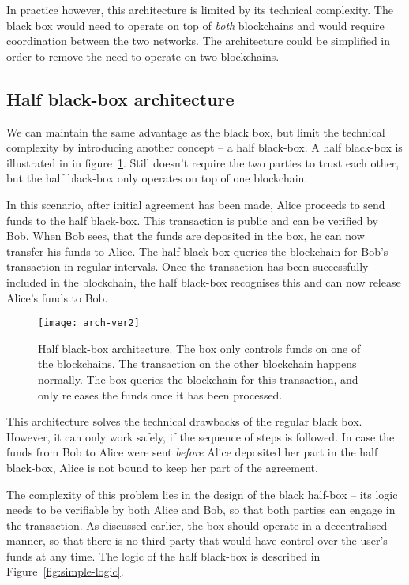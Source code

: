 In practice however, this architecture is limited by its technical complexity. The black box would need to operate on top of \textit{both} blockchains and would require coordination between the two networks. The architecture could be simplified in order to remove the need to operate on two blockchains.

\subsection{Half black-box architecture}
We can maintain the same advantage as the black box, but limit the technical complexity by introducing another concept -- a half black-box. A half black-box is illustrated in in figure~\ref{fig:arch-ver2}. Still doesn't require the two parties to trust each other, but the half black-box only operates on top of one blockchain.

In this scenario, after initial agreement has been made, Alice proceeds to send funds to the half black-box. This transaction is public and can be verified by Bob. When Bob sees, that the funds are deposited in the box, he can now transfer his funds to Alice. The half black-box queries the blockchain for Bob's transaction in regular intervals. Once the transaction has been successfully included in the blockchain, the half black-box recognises this and can now release Alice's funds to Bob.
% 
\begin{figure}[ht]
    \centering
    \texttt{[image: arch-ver2]}
    \caption{Half black-box architecture. The box only controls funds on one of the blockchains. The transaction on the other blockchain happens normally. The box queries the blockchain for this transaction, and only releases the funds once it has been processed.}
    \label{fig:arch-ver2}
\end{figure}

This architecture solves the technical drawbacks of the regular black box. However, it can only work safely, if the sequence of steps is followed. In case the funds from Bob to Alice were sent \textit{before} Alice deposited her part in the half black-box, Alice is not bound to keep her part of the agreement.

The complexity of this problem lies in the design of the black half-box -- its logic needs to be verifiable by both Alice and Bob, so that both parties can engage in the transaction. As discussed earlier, the box should operate in a decentralised manner, so that there is no third party that would have control over the user's funds at any time. The logic of the half black-box is described in Figure~\ref{fig:simple-logic}.


